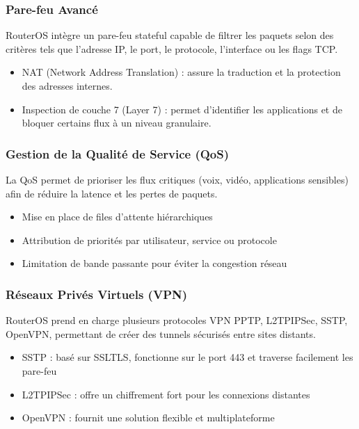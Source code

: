 \subsubsection*{Pare-feu Avancé}
\gls{RouterOS} intègre un pare-feu stateful capable de filtrer les paquets selon des critères 
tels que l’adresse \gls{IP}, le port, le protocole, l’interface ou les flags TCP.
\begin{itemize}
    \item \gls{NAT} (Network Address Translation) : assure la traduction et la protection des adresses internes.
    \item Inspection de couche 7 (Layer 7) : permet d’identifier les applications et de bloquer certains flux à un niveau granulaire.
\end{itemize}

\subsubsection*{Gestion de la Qualité de Service (\gls{QoS})}
La \gls{QoS} permet de prioriser les flux critiques (voix, vidéo, applications sensibles) afin 
de réduire la latence et les pertes de paquets.
\begin{itemize}
    \item Mise en place de files d’attente hiérarchiques
    \item Attribution de priorités par utilisateur, service ou protocole
    \item Limitation de bande passante pour éviter la congestion réseau
\end{itemize}

\subsubsection*{Réseaux Privés Virtuels (\gls{VPN})}
\gls{RouterOS} prend en charge plusieurs protocoles \gls{VPN} \gls{PPTP}, \gls{L2TP}\/\gls{IPSec}, \gls{SSTP}, \gls{OpenVPN}, 
permettant de créer des tunnels sécurisés entre sites distants.
\begin{itemize}
    \item \gls{SSTP} : basé sur \gls{SSL}\/\gls{TLS}, fonctionne sur le port 443 et traverse facilement les pare-feu
    \item \gls{L2TP}\/\gls{IPSec} : offre un chiffrement fort pour les connexions distantes
    \item \gls{OpenVPN} : fournit une solution flexible et multiplateforme
\end{itemize}

